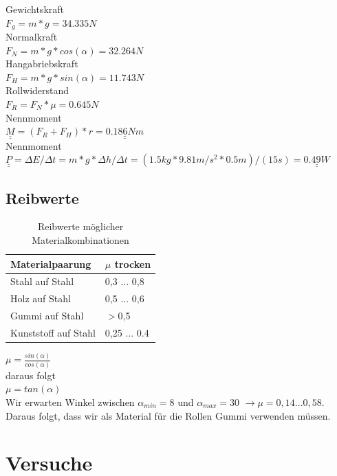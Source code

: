 \documentclass[a4paper]{report}
\begin{document}
\noindent
Gewichtskraft\\
$F_{g}=m*g=34.335 N$	\\
Normalkraft	\\
$F_{N}=m*g*cos(\alpha)=32.264 N$	\\
Hangabriebskraft	\\
$F_{H}=m*g*sin(\alpha)=11.743 N$	\\
Rollwiderstand	\\
$F_{R}=F_{N}*\mu=0.645 N$	\\
Nennmoment	\\
$\underline{\underline{M}}=(F_{R}+F_{H})*r=\underline{\underline{0.186 Nm}}$	\\
Nennmoment	\\
$\underline{\underline{P}}=\Delta E/\Delta t=m*g*\Delta h/\Delta t=(1.5kg*9.81m/s^2*0.5m)/(15s)=\underline{\underline{0.49W}}$\\

\subsection{Reibwerte}
\label{ssec:ReibWer}

\begin{table}[h!]
	\centering
	\begin{tabular}{|p{}|p{}|}
		\hline
		\textbf{Materialpaarung} & \textbf{$\mu$ trocken}\\
		\hline
		Stahl auf Stahl & 0,3 ... 0,8 \\
		\hline
		Holz auf Stahl & 0,5 ... 0,6\\
		\hline
		Gummi auf Stahl & $>$0,5 \\
		\hline
		Kunststoff auf Stahl & 0,25 ... 0.4\\
		\hline
	\end{tabular}
	\caption{Reibwerte möglicher Materialkombinationen \parencite{Wittel2015}}
	\label{tab:Reibwerte}
\end{table}

\noindent
$\mu=\frac{sin(\alpha)}{cos(\alpha)}$\\

\noindent
daraus folgt\\
$\mu=tan(\alpha)$\\
Wir erwarten Winkel zwischen  $\alpha_{min}=8$ und $\alpha_{max}=30$ $ \rightarrow \mu = 0,14 ... 0,58$. Daraus folgt, dass wir als Material für die Rollen Gummi verwenden müssen. \\


\section{Versuche}
\label{sec:Versuche}
\end{document}
